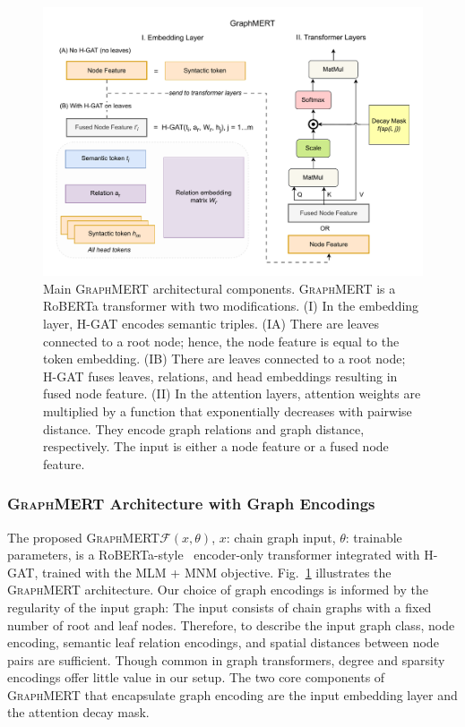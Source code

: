 \documentclass[10pt]{article}
\newcommand{\ours}{\textsc{GraphMERT}\xspace}
\begin{document}
\begin{figure}[t]
    \centering
    \includegraphics[width=\linewidth]{pictures/graphmert.pdf}
    \caption{Main \ours architectural components. \ours is a RoBERTa transformer with two modifications.
    (I) In the embedding layer, H-GAT encodes semantic triples. (IA) There are leaves connected to a root node; hence, the node feature is equal to the token embedding. (IB) There are leaves connected to a root node; H-GAT fuses leaves, relations, and head embeddings resulting in fused node feature.
    (II) In the attention layers, attention weights are multiplied by a function that exponentially decreases with pairwise distance. They encode graph relations and graph distance, respectively. The input is either a node feature or a fused node feature.}
    \label{fig:graphmert}
\end{figure}



\subsubsection{\ours Architecture with Graph Encodings}
\label{subsubsec:glm_architecture}

The proposed \ours $\mathcal{F}(x, \theta)$, $x$: chain graph input, $\theta$: trainable parameters, is a RoBERTa-style~\cite{roberta2019} encoder-only transformer integrated with H-GAT, trained with the MLM + MNM objective. Fig.~\ref{fig:graphmert} illustrates the \ours architecture. 
Our choice of graph encodings is informed by the regularity of the input graph: The input consists of chain graphs with a fixed number of root and leaf nodes. Therefore, to describe the input graph class, node encoding, semantic leaf relation encodings, and spatial distances between node pairs are sufficient. Though common in graph transformers, degree and sparsity encodings offer little value in our setup. The two core components of \ours that encapsulate graph encoding are the input embedding layer and the attention decay mask.
\end{document}
